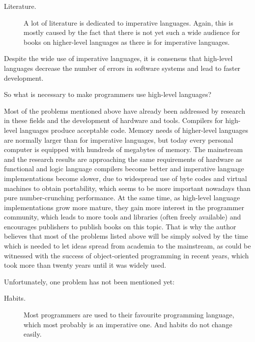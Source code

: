 \begin{description}
\item[Literature.]  A lot of literature is dedicated to imperative
  languages.  Again, this is mostly caused by the fact that there is
  not yet such a wide audience for books on higher-level languages as
  there is for imperative languages.
\end{description}

\noindent
Despite the wide use of imperative languages, it is consensus that
high-level languages decrease the number of errors in software systems
and lead to faster development.

So what is necessary to make programmers use high-level languages?

Most of the problems mentioned above have already been addressed by
research in these fields and the development of hardware and tools.
Compilers for high-level languages produce acceptable code.  Memory
needs of higher-level languages are normally larger than for
imperative languages, but today every personal computer is equipped
with hundreds of megabytes of memory.  The mainstream and the research
results are approaching the same requirements of hardware as
functional and logic language compilers become better and imperative
language implementations become slower, due to widespread use of byte
codes%
 and virtual machines%
 to obtain portability, which seems to be more
important nowadays than pure number-crunching performance.  At the
same time, as high-level language implementations grow more mature,
they gain more interest in the programmer community, which leads to
more tools and libraries (often freely available) and encourages
publishers to publish books on this topic.  That is why the author
believes that most of the problems listed above will be simply solved
by the time which is needed to let ideas spread from academia to the
mainstream, as could be witnessed with the success of object-oriented%
 programming in recent years, which
took more than twenty years until it was widely used.

Unfortunately, one problem has not been mentioned yet:

\begin{description}
\item[Habits.]  Most programmers are used to their favourite
  programming language, which most probably is an imperative one.  And
  habits do not change easily.
\end{description}

